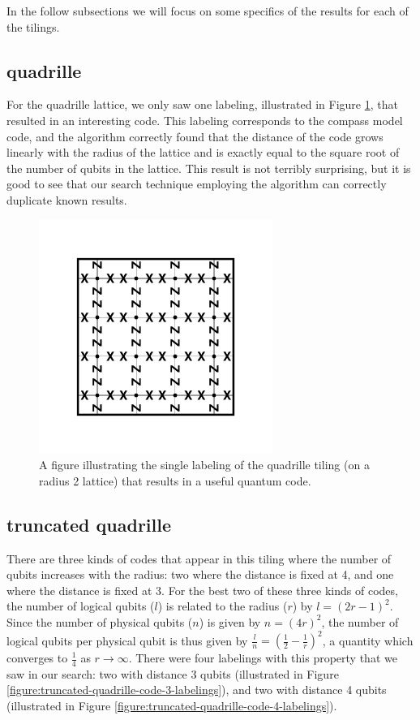 \documentclass[12pt]{amsbook}
\theoremstyle{plain}
\theoremstyle{definition}
\theoremstyle{remark}
\newcommand{\half}{\frac{1}{2}}
\newcommand{\paren}[1]{\left(#1\right)}
\begin{document}
In the follow subsections we will focus on some specifics of the results for each of the tilings.

\subsection{quadrille}

For the quadrille lattice, we only saw one labeling, illustrated in Figure \ref{figure:quadrille-code-labeling}, that resulted in an interesting code.  This labeling corresponds to the compass model code, and the algorithm correctly found that the distance of the code grows linearly with the radius of the lattice and is exactly equal to the square root of the number of qubits in the lattice.  This result is not terribly surprising, but it is good to see that our search technique employing the algorithm can correctly duplicate known results.

\begin{figure}
\includegraphics[width=3in]{images/quadrille-code-labeling}
\caption{
\label{figure:quadrille-code-labeling}
A figure illustrating the single labeling of the quadrille tiling (on a radius 2 lattice) that results in a useful quantum code.
}
\end{figure}
\subsection{truncated quadrille}

There are three kinds of codes that appear in this tiling where the number of qubits increases with the radius:  two where the distance is fixed at 4, and one where the distance is fixed at 3.  For the best two of these three kinds of codes, the number of logical qubits ($l$) is related to the radius ($r$) by $l=(2r-1)^2$.    Since the number of physical qubits ($n$) is given by $n=(4r)^2$, the number of logical qubits per physical qubit is thus given by $\frac{l}{n}=\paren{\half-\frac{1}{r}}^2$, a quantity which converges to $\frac{1}{4}$ as $r\to\infty$.  There were four labelings with this property that we saw in our search:  two with distance 3 qubits (illustrated in Figure \ref{figure:truncated-quadrille-code-3-labelings}), and two with distance 4 qubits (illustrated in Figure \ref{figure:truncated-quadrille-code-4-labelings}).
\end{document}
